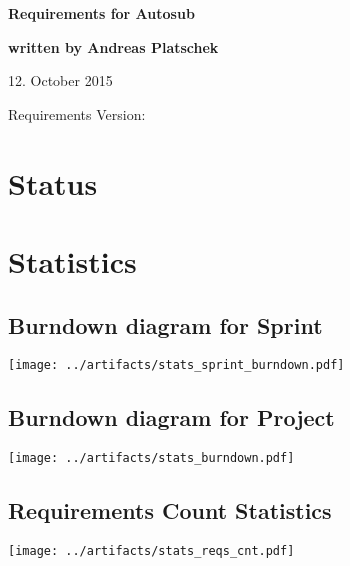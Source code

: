 \documentclass{report}
\begin{document}
\thispagestyle{empty}

\mbox{}

\vfill

{\LARGE\textbf{Requirements for Autosub}}

\vfill

{\Large\textbf{written by Andreas Platschek}}

\vfill

12. October 2015

\vfill

Requirements Version: 

\vfill

\newpage

\tableofcontents

\newpage

\chapter{Status}




\chapter{Statistics}
\section{Burndown diagram for Sprint}
\texttt{[image: ../artifacts/stats\_sprint\_burndown.pdf]}

\section{Burndown diagram for Project}
\texttt{[image: ../artifacts/stats\_burndown.pdf]}

\section{Requirements Count Statistics}
\texttt{[image: ../artifacts/stats\_reqs\_cnt.pdf]}
\end{document}
